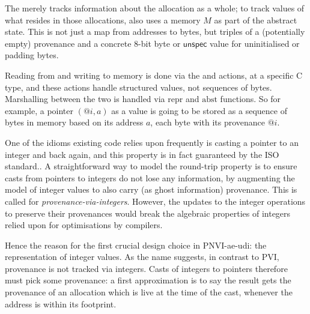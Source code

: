 The  merely tracks information about the allocation as a
whole; to track values of what resides in those allocations, 
also uses a memory $M$ as part of the abstract state. This is not just a map
from addresses to bytes, but triples of a (potentially empty) provenance and a
concrete 8-bit byte or $\mathsf{unspec}$ value for uninitialised or padding
bytes.\label{sn:ignore-ptr-index}

Reading from and writing to memory is done via the  and
 actions, at a specific C type, and these actions handle
structured  values, not sequences of bytes. Marshalling between the
two is handled via $\mathrm{repr}$ and $\mathrm{abst}$ functions. So for
example, a pointer $(@i, a)$ as a value is going to be stored as a sequence of
bytes in memory based on its address $a$, each byte with its provenance
$@i$.

One of the idioms existing code relies upon frequently is casting a pointer to
an integer and back again, and this  property is in fact
guaranteed by the ISO standard.. A
straightforward way to model the round-trip property is to ensure casts from
pointers to integers do not lose any information, by augmenting the model of
integer values to also carry (as ghost information) provenance. This is called
 for \emph{provenance-via-integers}. However, the updates to the
integer operations to preserve their provenances would break the algebraic
properties of integers relied upon for optimisations by compilers.

Hence the reason for the first crucial design choice in PNVI-ae-udi: the
representation of integer values. As the name suggests, in contrast to PVI,
provenance is not tracked via integers. Casts of integers to pointers therefore
must pick some provenance: a first approximation is to say the result gets the
provenance of an allocation which is live at the time of the cast, whenever the
address is within its footprint.


